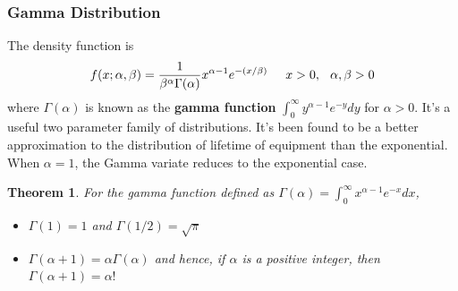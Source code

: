 \documentclass{article}
\newtheorem{theorem}{Theorem}[section]
\begin{document}
\subsubsection{Gamma Distribution}

The density function is 
\begin{equation*}
    f(x;\alpha,\beta)=\frac{1}{\beta^\alpha \Gamma(\alpha)} x^{\alpha-1} e^{-(x/\beta)} \hspace{0.5cm} x>0, \hspace{0.25cm} \alpha,\beta>0
\end{equation*}
where \(\Gamma(\alpha)\) is known as the \textbf{gamma function} \(\int_{0}^{\infty} y^{\alpha-1}e^{-y}dy\) for \(\alpha>0\). It's a useful two parameter family of distributions. It's been found to be a better approximation to the distribution of lifetime of equipment than the exponential. When \(\alpha=1\), the Gamma variate reduces to the exponential case.

\begin{theorem}
    For the gamma function defined as \(\Gamma(\alpha)=\int_{0}^{\infty} x^{\alpha-1}e^{-x}dx\),
    \begin{itemize}
        \item \(\Gamma(1)=1\) and \(\Gamma(1/2)=\sqrt{\pi}\)
        \item \(\Gamma(\alpha+1)=\alpha\Gamma(\alpha)\) and hence, if \(\alpha\) is a positive integer, then \(\Gamma(\alpha+1)=\alpha!\)
    \end{itemize}
\end{theorem}
\end{document}
